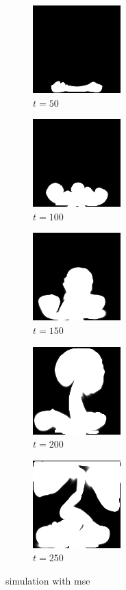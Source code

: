 \documentclass[a4paper,12pt,twoside]{report}
\begin{document}
\begin{figure}
\centering
\begin{subfigure}{0.18\textwidth}
  \centering
  \includegraphics[scale=0.56]{buoyancy/dens_000050_mse.png}
  \caption{$t=50$}
\end{subfigure}
\begin{subfigure}{0.18\textwidth}
  \centering
  \includegraphics[scale=0.56]{buoyancy/dens_000100_mse.png}
  \caption{$t=100$}
\end{subfigure}
\begin{subfigure}{0.18\textwidth}
  \centering
  \includegraphics[scale=0.56]{buoyancy/dens_000150_mse.png}
  \caption{$t=150$}
\end{subfigure}
\begin{subfigure}{0.18\textwidth}
  \centering
  \includegraphics[scale=0.56]{buoyancy/dens_000200_mse.png}
  \caption{$t=200$}
\end{subfigure}
\begin{subfigure}{0.18\textwidth}
  \centering
  \includegraphics[scale=0.56]{buoyancy/dens_000249_mse.png}
  \caption{$t=250$}
\end{subfigure}
\caption{simulation with mse}
\end{figure}
\end{document}
